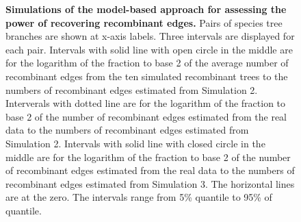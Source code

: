 \documentclass[10pt]{article}
\begin{document}
\begin{figure}



\caption{
{\bf Simulations of the model-based approach for assessing the power of recovering
recombinant edges.} Pairs of species tree branches are shown at x-axis labels.
Three intervals are displayed for each pair. Intervals with solid line with open
circle in the middle are for the logarithm of the fraction to base 2 of the average
number of recombinant edges from the ten simulated recombinant trees 
to the numbers of recombinant edges estimated from Simulation 2. 
Interverals with dotted line are for the logarithm of the fraction to base 2 of
the number of recombinant edges estimated from the real data
to the numbers of recombinant edges estimated from Simulation 2.
Intervals with solid line with closed circle in the middle are for the logarithm
of the fraction to base 2 of the number of recombinant edges estimated from the real data
to the numbers of recombinant edges estimated from Simulation 3. 
The horizontal lines are at the zero.
The intervals range from 5\% quantile to 95\% of quantile.}
\label{fig:h3}
\end{figure}
\clearpage{}%

\clearpage{}\setcounter{figure}{0}
\setcounter{table}{0}
\renewcommand{\figurename}{Supplementary Figure}
\renewcommand{\tablename}{Supplementary Table}

\end{document}
